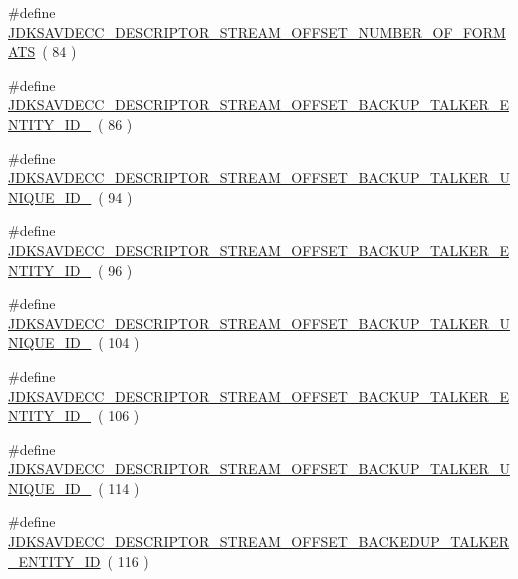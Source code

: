 \begin{DoxyCompactItemize}
\item 
\#define \hyperlink{group__descriptor__stream_ga1d6bd1e205a6ee825efcb6e8291da077}{J\+D\+K\+S\+A\+V\+D\+E\+C\+C\+\_\+\+D\+E\+S\+C\+R\+I\+P\+T\+O\+R\+\_\+\+S\+T\+R\+E\+A\+M\+\_\+\+O\+F\+F\+S\+E\+T\+\_\+\+N\+U\+M\+B\+E\+R\+\_\+\+O\+F\+\_\+\+F\+O\+R\+M\+A\+TS}~( 84 )
\item 
\#define \hyperlink{group__descriptor__stream_ga342f66f404f730f15c65bc78b1ec0f4c}{J\+D\+K\+S\+A\+V\+D\+E\+C\+C\+\_\+\+D\+E\+S\+C\+R\+I\+P\+T\+O\+R\+\_\+\+S\+T\+R\+E\+A\+M\+\_\+\+O\+F\+F\+S\+E\+T\+\_\+\+B\+A\+C\+K\+U\+P\+\_\+\+T\+A\+L\+K\+E\+R\+\_\+\+E\+N\+T\+I\+T\+Y\+\_\+\+I\+D\+\_}~( 86 )
\item 
\#define \hyperlink{group__descriptor__stream_ga60fc54bb766dfdd1223aaf544093b2ec}{J\+D\+K\+S\+A\+V\+D\+E\+C\+C\+\_\+\+D\+E\+S\+C\+R\+I\+P\+T\+O\+R\+\_\+\+S\+T\+R\+E\+A\+M\+\_\+\+O\+F\+F\+S\+E\+T\+\_\+\+B\+A\+C\+K\+U\+P\+\_\+\+T\+A\+L\+K\+E\+R\+\_\+\+U\+N\+I\+Q\+U\+E\+\_\+\+I\+D\+\_}~( 94 )
\item 
\#define \hyperlink{group__descriptor__stream_ga4966f69eb2e0075eaa9cfd1cb548cae1}{J\+D\+K\+S\+A\+V\+D\+E\+C\+C\+\_\+\+D\+E\+S\+C\+R\+I\+P\+T\+O\+R\+\_\+\+S\+T\+R\+E\+A\+M\+\_\+\+O\+F\+F\+S\+E\+T\+\_\+\+B\+A\+C\+K\+U\+P\+\_\+\+T\+A\+L\+K\+E\+R\+\_\+\+E\+N\+T\+I\+T\+Y\+\_\+\+I\+D\+\_}~( 96 )
\item 
\#define \hyperlink{group__descriptor__stream_gabf3900db40c1c10b31d7aa642ac7a72b}{J\+D\+K\+S\+A\+V\+D\+E\+C\+C\+\_\+\+D\+E\+S\+C\+R\+I\+P\+T\+O\+R\+\_\+\+S\+T\+R\+E\+A\+M\+\_\+\+O\+F\+F\+S\+E\+T\+\_\+\+B\+A\+C\+K\+U\+P\+\_\+\+T\+A\+L\+K\+E\+R\+\_\+\+U\+N\+I\+Q\+U\+E\+\_\+\+I\+D\+\_}~( 104 )
\item 
\#define \hyperlink{group__descriptor__stream_ga60ba06b81463eedda5ae9298e3afd077}{J\+D\+K\+S\+A\+V\+D\+E\+C\+C\+\_\+\+D\+E\+S\+C\+R\+I\+P\+T\+O\+R\+\_\+\+S\+T\+R\+E\+A\+M\+\_\+\+O\+F\+F\+S\+E\+T\+\_\+\+B\+A\+C\+K\+U\+P\+\_\+\+T\+A\+L\+K\+E\+R\+\_\+\+E\+N\+T\+I\+T\+Y\+\_\+\+I\+D\+\_}~( 106 )
\item 
\#define \hyperlink{group__descriptor__stream_ga764e85b936b4605962a811447d279c31}{J\+D\+K\+S\+A\+V\+D\+E\+C\+C\+\_\+\+D\+E\+S\+C\+R\+I\+P\+T\+O\+R\+\_\+\+S\+T\+R\+E\+A\+M\+\_\+\+O\+F\+F\+S\+E\+T\+\_\+\+B\+A\+C\+K\+U\+P\+\_\+\+T\+A\+L\+K\+E\+R\+\_\+\+U\+N\+I\+Q\+U\+E\+\_\+\+I\+D\+\_}~( 114 )
\item 
\#define \hyperlink{group__descriptor__stream_ga5ff1d51ca0a3195b769043c0d51d3cdc}{J\+D\+K\+S\+A\+V\+D\+E\+C\+C\+\_\+\+D\+E\+S\+C\+R\+I\+P\+T\+O\+R\+\_\+\+S\+T\+R\+E\+A\+M\+\_\+\+O\+F\+F\+S\+E\+T\+\_\+\+B\+A\+C\+K\+E\+D\+U\+P\+\_\+\+T\+A\+L\+K\+E\+R\+\_\+\+E\+N\+T\+I\+T\+Y\+\_\+\+ID}~( 116 )

\end{DoxyCompactItemize}
